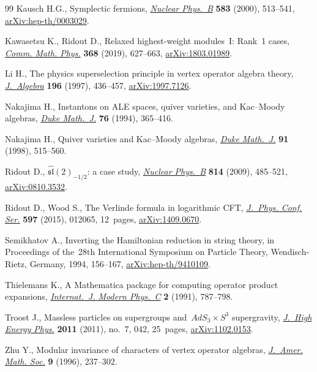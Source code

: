 \documentclass[10pt,a4paper]{amsart}
\numberwithin{equation}{section}
\begin{document}
\begin{thebibliography}{99}
Kausch H.G., Symplectic fermions,
 \href{https://doi.org/10.1016/S0550-3213(00)00295-9}{\textit{Nuclear
 Phys.~B}} \textbf{583} (2000), 513--541,
 \href{http://arxiv.org/abs/hep-th/0003029}{arXiv:hep-th/0003029}.

Kawasetsu K., Ridout D., Relaxed highest-weight modules~{I}: {R}ank~1 cases,
 \href{https://doi.org/10.1007/s00220-019-03305-x}{\textit{Comm. Math. Phys.}}
 \textbf{368} (2019), 627--663,
 \href{http://arxiv.org/abs/1803.01989}{arXiv:1803.01989}.

Li H., The physics superselection principle in vertex operator algebra theory,
 \href{https://doi.org/10.1006/jabr.1997.7126}{\textit{J.~Algebra}}
 \textbf{196} (1997), 436--457,
 \href{http://arxiv.org/abs/1997.7126}{arXiv:1997.7126}.

Nakajima H., Instantons on {ALE} spaces, quiver varieties, and {K}ac--{M}oody
 algebras, \href{https://doi.org/10.1215/S0012-7094-94-07613-8}{\textit{Duke
 Math.~J.}} \textbf{76} (1994), 365--416.

Nakajima H., Quiver varieties and {K}ac--{M}oody algebras,
 \href{https://doi.org/10.1215/S0012-7094-98-09120-7}{\textit{Duke Math.~J.}}
 \textbf{91} (1998), 515--560.

Ridout D., {$\widehat{\mathfrak{sl}}(2)_{-1/2}$}: a case study,
 \href{https://doi.org/10.1016/j.nuclphysb.2009.01.008}{\textit{Nuclear
 Phys.~B}} \textbf{814} (2009), 485--521,
 \href{http://arxiv.org/abs/0810.3532}{arXiv:0810.3532}.

Ridout D., Wood S., The {V}erlinde formula in logarithmic {CFT},
 \href{https://doi.org/10.1088/1742-6596/597/1/012065}{\textit{J.~Phys. Conf.
 Ser.}} \textbf{597} (2015), 012065, 12~pages,
 \href{http://arxiv.org/abs/1409.0670}{arXiv:1409.0670}.

Semikhatov A., Inverting the {H}amiltonian reduction in string theory, in
 Proceedings of the~28th {I}nternational {S}ymposium on {P}article {T}heory,
 Wendisch-Rietz, Germany, 1994, 156--167,
 \href{http://arxiv.org/abs/hep-th/9410109}{arXiv:hep-th/9410109}.

Thielemans K., A {M}athematica package for computing operator product
 expansions,
 \href{https://doi.org/10.1142/S0129183191001001}{\textit{Internat.~J. Modern
 Phys.~C}} \textbf{2} (1991), 787--798.

Troost J., Massless particles on supergroups and~{$AdS_3\times S^3$}
 supergravity, \href{https://doi.org/10.1007/JHEP07(2011)042}{\textit{J.~High
 Energy Phys.}} \textbf{2011} (2011), no.~7, 042, 25~pages,
 \href{http://arxiv.org/abs/1102.0153}{arXiv:1102.0153}.

Zhu Y., Modular invariance of characters of vertex operator algebras,
 \href{https://doi.org/10.1090/S0894-0347-96-00182-8}{\textit{J.~Amer. Math.
 Soc.}} \textbf{9} (1996), 237--302.

\end{thebibliography}
\end{document}

